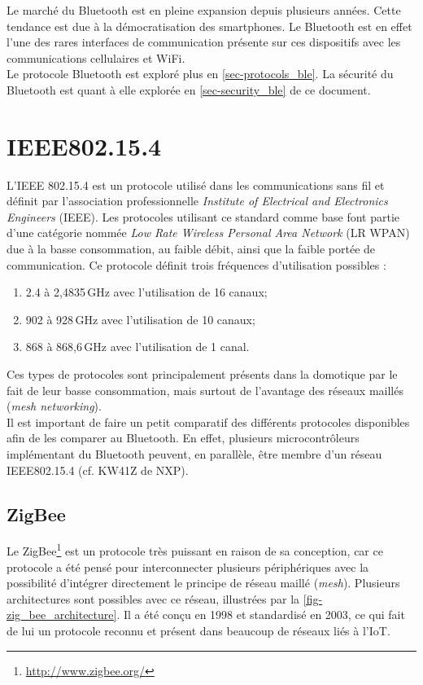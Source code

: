 Le marché du Bluetooth est en pleine expansion depuis plusieurs années. Cette tendance est due à la démocratisation des smartphones. Le Bluetooth est en effet l'une des rares interfaces de communication présente sur ces dispositifs avec les communications cellulaires et WiFi.\\


Le protocole Bluetooth est exploré plus en \cref{sec-protocols_ble}. La sécurité du Bluetooth est quant à elle explorée en \cref{sec-security_ble} de ce document.


\section{IEEE802.15.4}

L'IEEE 802.15.4 est un protocole utilisé dans les communications sans fil et définit par l'association professionnelle \textit{Institute of Electrical and Electronics Engineers} (IEEE)\cite{IEEE802137:online}. Les protocoles utilisant ce standard comme base font partie d'une catégorie nommée \textit{Low Rate Wireless Personal Area Network} (LR WPAN) due à la basse consommation, au faible débit, ainsi que la faible portée de communication. Ce protocole définit trois fréquences d'utilisation possibles : 

\begin{enumerate}
    \item 2.4 à 2,4835\,GHz avec l'utilisation de 16 canaux;
    \item 902 à 928\,GHz avec l'utilisation de 10 canaux;
    \item 868 à 868,6\,GHz avec l'utilisation de 1 canal.
\end{enumerate}


Ces types de protocoles sont principalement présents dans la domotique par le fait de leur basse consommation, mais surtout de l'avantage des réseaux maillés (\textit{mesh networking}). \\

Il est important de faire un petit comparatif des différents protocoles disponibles afin de les comparer au Bluetooth. En effet, plusieurs microcontrôleurs implémentant du Bluetooth peuvent, en parallèle, être membre d'un réseau IEEE802.15.4 (cf. KW41Z de NXP).

\subsection{ZigBee}


Le ZigBee\footnote{\url{http://www.zigbee.org/}} est un protocole très puissant en raison de sa conception, car ce protocole a été pensé pour interconnecter plusieurs périphériques avec la possibilité d'intégrer directement le principe de réseau maillé (\textit{mesh}). Plusieurs architectures sont possibles avec ce réseau, illustrées par la \cref{fig-zig_bee_architecture}. Il a été conçu en 1998 et standardisé en 2003\cite{ZigBeeW24:online}, ce qui fait de lui un protocole reconnu et présent dans beaucoup de réseaux liés à l'IoT.


